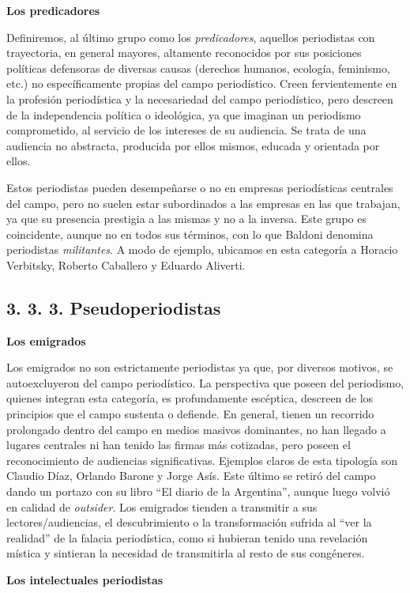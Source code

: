 \textbf{Los predicadores}

Definiremos, al último grupo como los \emph{predicadores}, aquellos periodistas con trayectoria, en general mayores, altamente reconocidos por sus posiciones políticas defensoras de diversas causas (derechos humanos, ecología, feminismo, etc.) no específicamente propias del campo periodístico. Creen fervientemente en la profesión periodística y la necesariedad del campo periodístico, pero descreen de la independencia política o ideológica, ya que imaginan un periodismo comprometido, al servicio de los intereses de su audiencia. Se trata de una audiencia no abstracta, producida por ellos mismos, educada y orientada por ellos.

Estos periodistas pueden desempeñarse o no en empresas periodísticas centrales del campo, pero no suelen estar subordinados a las empresas en las que trabajan, ya que su presencia prestigia a las mismas y no a la inversa. Este grupo es coincidente, aunque no en todos sus términos, con lo que Baldoni denomina periodistas \emph{militantes}. A modo de ejemplo, ubicamos en esta categoría a Horacio Verbitsky, Roberto Caballero y Eduardo Aliverti.


\subsection{3. 3. 3. Pseudoperiodistas}

\textbf{Los emigrados}

Los emigrados no son estrictamente periodistas ya que, por diversos motivos, se autoexcluyeron del campo periodístico. La perspectiva que poseen del periodismo, quienes integran esta categoría, es profundamente escéptica, descreen de los principios que el campo sustenta o defiende. En general, tienen un recorrido prolongado dentro del campo en medios masivos dominantes, no han llegado a lugares centrales ni han tenido las firmas más cotizadas, pero poseen el reconocimiento de audiencias significativas. Ejemplos claros de esta tipología son Claudio Díaz, Orlando Barone y Jorge Asís. Este último se retiró del campo dando un portazo con su libro ``El diario de la Argentina'', aunque luego volvió en calidad de \emph{outsider}. Los emigrados tienden a transmitir a sus lectores/audiencias, el descubrimiento o la transformación sufrida al ``ver la realidad'' de la falacia periodística, como si hubieran tenido una revelación mística y sintieran la necesidad de transmitirla al resto de sus congéneres.

\textbf{Los intelectuales periodistas}

